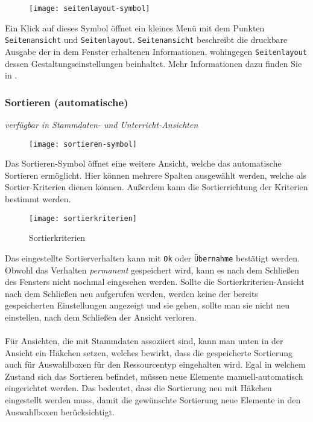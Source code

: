 \begin{wrapfigure}{r}{.06\textwidth}
	\vspace{-50pt}
	\texttt{[image: seitenlayout-symbol]}
	\vspace{-35pt}
\end{wrapfigure}

\noindent
Ein Klick auf dieses Symbol öffnet ein kleines Menü mit dem Punkten \texttt{Seitenansicht} und \texttt{Seitenlayout}. \texttt{Seitenansicht} beschreibt die druckbare Ausgabe der in dem Fenster erhaltenen Informationen, wohingegen \texttt{Seitenlayout} dessen Gestaltungseinstellungen beinhaltet. Mehr Informationen dazu finden Sie in .

\subsubsection{Sortieren (automatische)}
{\small\textit{verfügbar in Stammdaten- und Unterricht-Ansichten\\}\par}

\begin{wrapfigure}{r}{.05\textwidth}
	\vspace{-50pt}
	\texttt{[image: sortieren-symbol]}
	\vspace{-35pt}
\end{wrapfigure}

\noindent
Das Sortieren-Symbol öffnet eine weitere Ansicht, welche das automatische Sortieren ermöglicht. Hier können mehrere Spalten ausgewählt werden, welche als Sortier-Kriterien dienen können. Außerdem kann die Sortierrichtung der Kriterien bestimmt werden.\\

\begin{wrapfigure}{r}{0.35\textwidth}
	\texttt{[image: sortierkriterien]}
	\vspace{-15pt}
	\caption{Sortierkriterien}
	\label{fig:sortierkriterien}
\end{wrapfigure}

\noindent
Das eingestellte Sortierverhalten kann mit \texttt{Ok} oder \texttt{Übernahme} bestätigt werden. Obwohl das Verhalten \textit{permanent} gespeichert wird, kann es nach dem Schließen des Fensters nicht nochmal eingesehen werden. Sollte die Sortierkriterien-Ansicht nach dem Schließen neu aufgerufen werden, werden keine der bereits gespeicherten Einstellungen angezeigt und sie gehen, sollte man sie nicht neu einstellen, nach dem Schließen der Ansicht verloren.\\
\\
Für Ansichten, die mit Stammdaten assoziiert sind, kann man unten in der Ansicht ein Häkchen setzen, welches bewirkt, dass die gespeicherte Sortierung auch für Auswahlboxen für den Ressourcentyp eingehalten wird. Egal in welchem Zustand sich das Sortieren befindet, müssen neue Elemente manuell-automatisch eingerichtet werden. Das bedeutet, dass die Sortierung neu mit Häkchen eingestellt werden muss, damit die gewünschte Sortierung neue Elemente in den Auswahlboxen berücksichtigt.\\

